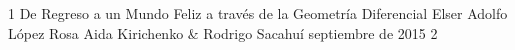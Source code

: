 \documentclass[letterpaper,12pt]{thesisECFM}
\theoremstyle{plain}
\theoremstyle{definition}
\theoremstyle{remark}
\begin{document}
\datosThesis%
{1}%
{De Regreso a un Mundo Feliz a través de la Geometría Diferencial}%
{Elser Adolfo L\'opez Rosa }%
{Aida Kirichenko  \& Rodrigo Sacahu\'i}%
{septiembre de 2015}		%
{2}							%






 

{\onehalfspacing	%

\tableofcontents    %





\mainmatter     %




{\backmatter     %


\cleardoublepage
{}
\renewcommand{\bibname}{BIBLIOGRAF\'IA}


}


%

\par}               %
\end{document}
